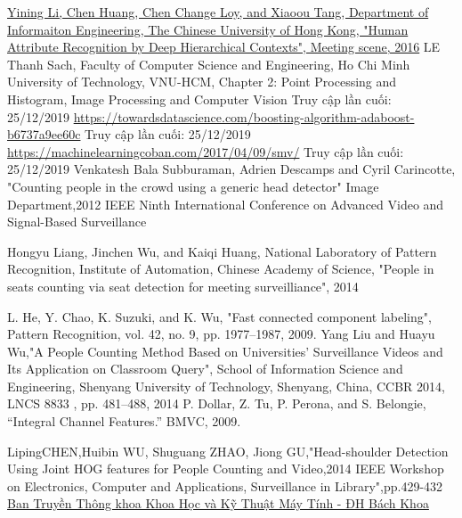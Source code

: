 \documentclass[12pt,a4paper]{article}
\begin{document}
		\begin{thebibliography}{9}
		    \href{http://mmlab.ie.cuhk.edu.hk/projects/WIDERAttribute.html}{Yining Li, Chen Huang, Chen Change Loy, and Xiaoou Tang, Department of Informaiton Engineering, The Chinese University of Hong Kong, "Human Attribute Recognition by Deep Hierarchical Contexts", Meeting scene, 2016}
		    LE Thanh Sach, Faculty of Computer Science and Engineering, Ho Chi Minh University of Technology, VNU-HCM, Chapter 2: Point Processing and Histogram, Image Processing and Computer Vision
            Truy cập lần cuối: 25/12/2019
            \url{https://towardsdatascience.com/boosting-algorithm-adaboost-b6737a9ee60c}
            Truy cập lần cuối: 25/12/2019
            \url{https://machinelearningcoban.com/2017/04/09/smv/}
            Truy cập lần cuối: 25/12/2019
		    Venkatesh Bala Subburaman, Adrien Descamps and Cyril Carincotte, "Counting people in the crowd using a generic head detector" Image Department,2012 IEEE Ninth International Conference on Advanced Video and Signal-Based Surveillance

			Hongyu Liang, Jinchen Wu, and Kaiqi Huang, National Laboratory of Pattern Recognition, Institute of Automation, Chinese Academy of Science, "People in seats counting via seat detection for meeting surveilliance", 2014

			L. He, Y. Chao, K. Suzuki, and K. Wu, "Fast connected component labeling", Pattern Recognition, vol. 42, no. 9, pp. 1977–1987, 2009.
			Yang Liu and Huayu Wu,"A People Counting Method Based on Universities’
Surveillance Videos and Its Application
on Classroom Query", School of Information Science and Engineering,
Shenyang University of Technology, Shenyang, China, CCBR 2014, LNCS 8833 , pp. 481–488, 2014
            P. Dollar, Z. Tu, P. Perona, and S. Belongie, “Integral Channel Features.” BMVC, 2009.

            LipingCHEN,Huibin WU, Shuguang ZHAO, Jiong GU,"Head-shoulder Detection Using Joint HOG features for People Counting and Video,2014 IEEE Workshop on Electronics, Computer and Applications,
Surveillance in Library",pp.429-432
            \href{https://www.facebook.com/BKCSE.Multimedia/}{Ban Truyền Thông khoa Khoa Học và Kỹ Thuật Máy Tính - ĐH Bách Khoa}


\end{thebibliography}
\end{document}
